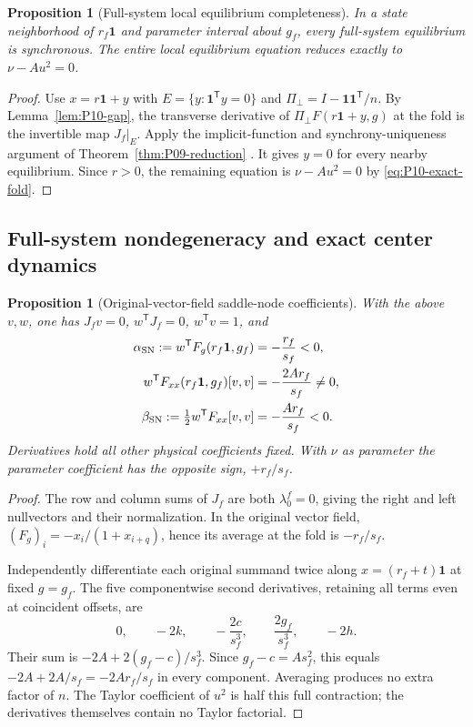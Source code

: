 \documentclass[11pt]{article}
\newcommand{\one}{\mathbf{1}}
\newtheorem{proposition}[theorem]{Proposition}
\theoremstyle{definition}
\theoremstyle{remark}
\begin{document}
\begin{proposition}[Full-system local equilibrium completeness]
\label{prop:P10-reduction}
In a state neighborhood of $r_f\one$ and parameter interval about
$g_f$, every full-system equilibrium is synchronous. The entire local
equilibrium equation reduces exactly to $\nu-Au^2=0$.
\end{proposition}
\begin{proof}
Use $x=r\one+y$ with $E=\{y:\one^{\mathsf T}y=0\}$ and
$\Pi_\perp=I-\one\one^{\mathsf T}/n$. By Lemma~\ref{lem:P10-gap},
the transverse derivative of $\Pi_\perp F(r\one+y,g)$ at the fold
is the invertible map $J_f|_E$. Apply the implicit-function and
synchrony-uniqueness argument of Theorem~\ref{thm:P09-reduction}
\cite[Ch.~1]{GuckenheimerHolmes1983}. It gives $y=0$ for every
nearby equilibrium. Since $r>0$, the remaining equation is
$\nu-Au^2=0$ by \eqref{eq:P10-exact-fold}.
\end{proof}

\subsection{Full-system nondegeneracy and exact center dynamics}

\begin{proposition}[Original-vector-field saddle-node coefficients]
\label{prop:P10-coefficients}
With the above $v,w$, one has $J_fv=0$, $w^{\mathsf T}J_f=0$,
$w^{\mathsf T}v=1$, and
\begin{align}
 \alpha_{\rm SN}:=w^{\mathsf T}F_g(r_f\one,g_f)
 &=-\frac{r_f}{s_f}<0,\label{eq:P10-alpha}\\
 w^{\mathsf T}F_{xx}(r_f\one,g_f)[v,v]
 &=-\frac{2Ar_f}{s_f}\ne0,\label{eq:P10-contraction}\\
 \beta_{\rm SN}:=\tfrac12w^{\mathsf T}F_{xx}[v,v]
 &=-\frac{Ar_f}{s_f}<0.\label{eq:P10-beta}
\end{align}
Derivatives hold all other physical coefficients fixed. With $\nu$
as parameter the parameter coefficient has the opposite sign,
$+r_f/s_f$.
\end{proposition}
\begin{proof}
The row and column sums of $J_f$ are both $\lambda_0^f=0$, giving
the right and left nullvectors and their normalization. In the original
vector field, $(F_g)_i=-x_i/(1+x_{i+q})$, hence its average at the
fold is $-r_f/s_f$.

Independently differentiate each original summand twice along
$x=(r_f+t)\one$ at fixed $g=g_f$. The five componentwise second
derivatives, retaining all terms even at coincident offsets, are
\[
 0,\qquad -2k,\qquad -\frac{2c}{s_f^3},\qquad
 \frac{2g_f}{s_f^3},\qquad -2h.
\]
Their sum is $-2A+2(g_f-c)/s_f^3$. Since $g_f-c=A s_f^2$,
this equals $-2A+2A/s_f=-2Ar_f/s_f$ in every component.
Averaging produces no extra factor of $n$. The Taylor coefficient
of $u^2$ is half this full contraction; the derivatives themselves
contain no Taylor factorial.
\end{proof}
\end{document}
